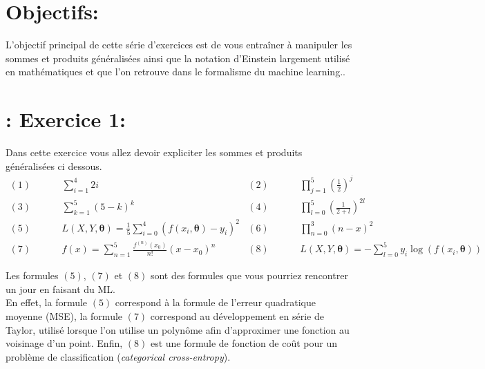 \documentclass[11pt, french]{article}
\begin{document}
\section*{Objectifs:}
L'objectif principal de cette série d'exercices est de vous entraîner à manipuler les sommes et produits généralisées ainsi que la notation d'Einstein largement utilisé en mathématiques et que l'on retrouve dans le formalisme du machine learning..






\section*{: Exercice 1:}
Dans cette exercice vous allez devoir expliciter les sommes et produits généralisées ci dessous.
\begin{align*}
    (1)\hspace{1cm} & \sum_{i = 1}^{4}2i  & (2)\hspace{1cm} & \prod_{j=1}^{5} \left(\frac{1}{2}\right)^j \\
    (3)\hspace{1cm} & \sum_{k = 1}^{5} (5-k)^k & (4)\hspace{1cm} & \prod_{l=0}^{5}\left(\frac{1}{2+l}\right)^{2l} \\
    (5)\hspace{1cm} & L(X,Y,\mathbf{\theta}) = \frac{1}{5}\sum_{i=0}^{4}\left(f(x_i,\mathbf{\theta})-y_i\right)^2  & (6)\hspace{1cm} & \prod_{n=0}^{3}(n-x)^2  \\
    (7)\hspace{1cm} & f(x) = \sum_{n = 1}^{5} \frac{f^{(n)}(x_0)}{n!}(x-x_0)^n & (8)\hspace{1cm} & L(X,Y,\mathbf{\theta}) = -\sum_{l=0}^{5} y_i\log(f(x_i,\mathbf{\theta}))
\end{align*}

Les formules $(5)$, $(7)$ et $(8)$ sont des formules que vous pourriez rencontrer un jour en faisant du ML.\\
En effet, la formule $(5)$ correspond à la formule de l'erreur quadratique moyenne (MSE), la formule $(7)$ correspond au développement en série de Taylor, utilisé lorsque l'on utilise un polynôme afin d'approximer une fonction au voisinage d'un point. Enfin, $(8)$ est une formule de fonction de coût pour un problème de classification (\textit{categorical cross-entropy}).
\end{document}
